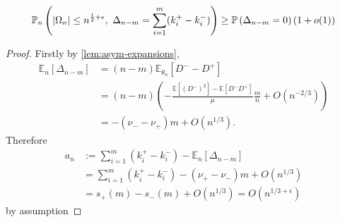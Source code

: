 \documentclass[draft]{scrartcl}
\newcommand{\E}{\mathbb E}
\newcommand{\littleo}{o}
\newcommand{\bigo}{O}
\newcommand{\defeq}{:=}
\DeclarePairedDelimiter{\abs}{\lvert}{\rvert}
\begin{document}
\begin{lemma}
    \label{lem:mod-dev-local}
    \begin{equation}
        \mathbb P_n \left( \abs{\Omega_n} \leq n^{\frac{1}{2} + \epsilon},\ \Delta_{n-m} = \sum_{i=1}^m (k_i^+ - k_i^-) \right)
        \geq \mathbb P \left( \Delta_{n-m} = 0 \right) (1 + \littleo(1))
    \end{equation}
\end{lemma}
\begin{proof}
    Firstly by \cref{lem:asym-expansions},
    \begin{align}
        \E_n[\Delta_{n-m}]
        &= (n - m) \E_{\theta_n}[D^- - D^+] \\ 
        &= (n - m) \left(-\frac{\E[(D^-)^2] - \E[D^- D^+]}{\mu} \frac{m}{n} + \bigo(n^{-2/3}) \right) \\
        &= -(\nu_- - \nu_+)m + \bigo(n^{1/3}).
    \end{align}
    Therefore 
    \begin{align}
        a_n
        &\defeq \sum_{i=1}^m (k_i^+ - k_i^-) - \E_n[\Delta_{n-m}] \\
        &= \sum_{i=1}^m (k_i^+ - k_i^-) - (\nu_+ - \nu_-)m + \bigo(n^{1/3}) \\
        &= s_+(m) - s_-(m) + \bigo(n^{1/3}) = \bigo(n^{1/3 + \epsilon})
    \end{align}
    by assumption


\end{proof}
\end{document}
